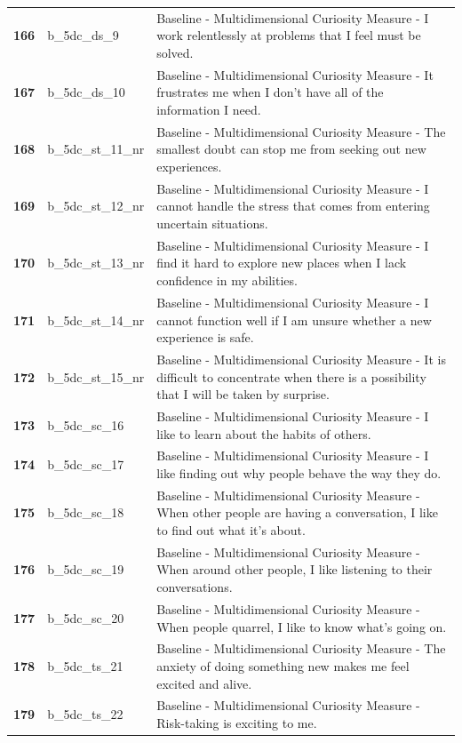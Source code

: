 \documentclass[
  letterpaper,
  DIV=11,
  numbers=noendperiod]{scrartcl}
\begin{document}
\begin{longtable}[t]{>{}cll}
\addlinespace
\textbf{166} & b\_5dc\_ds\_9 & Baseline - Multidimensional Curiosity Measure - I work relentlessly at problems that I feel must be solved.\\
\textbf{167} & b\_5dc\_ds\_10 & Baseline - Multidimensional Curiosity Measure - It frustrates me when I don't have all of the information I need.\\
\textbf{168} & b\_5dc\_st\_11\_nr & Baseline - Multidimensional Curiosity Measure - The smallest doubt can stop me from seeking out new experiences.\\
\textbf{169} & b\_5dc\_st\_12\_nr & Baseline - Multidimensional Curiosity Measure - I cannot handle the stress that comes from entering uncertain situations.\\
\textbf{170} & b\_5dc\_st\_13\_nr & Baseline - Multidimensional Curiosity Measure - I find it hard to explore new places when I lack confidence in my abilities.\\
\addlinespace
\textbf{171} & b\_5dc\_st\_14\_nr & Baseline - Multidimensional Curiosity Measure - I cannot function well if I am unsure whether a new experience is safe.\\
\textbf{172} & b\_5dc\_st\_15\_nr & Baseline - Multidimensional Curiosity Measure - It is difficult to concentrate when there is a possibility that I will be taken by surprise.\\
\textbf{173} & b\_5dc\_sc\_16 & Baseline - Multidimensional Curiosity Measure - I like to learn about the habits of others.\\
\textbf{174} & b\_5dc\_sc\_17 & Baseline - Multidimensional Curiosity Measure - I like finding out why people behave the way they do.\\
\textbf{175} & b\_5dc\_sc\_18 & Baseline - Multidimensional Curiosity Measure - When other people are having a conversation, I like to find out what it's about.\\
\addlinespace
\textbf{176} & b\_5dc\_sc\_19 & Baseline - Multidimensional Curiosity Measure - When around other people, I like listening to their conversations.\\
\textbf{177} & b\_5dc\_sc\_20 & Baseline - Multidimensional Curiosity Measure - When people quarrel, I like to know what's going on.\\
\textbf{178} & b\_5dc\_ts\_21 & Baseline - Multidimensional Curiosity Measure - The anxiety of doing something new makes me feel excited and alive.\\
\textbf{179} & b\_5dc\_ts\_22 & Baseline - Multidimensional Curiosity Measure - Risk-taking is exciting to me.\\

\end{longtable}
\end{document}

